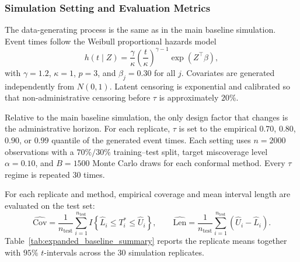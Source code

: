 \documentclass[12pt]{article}
\makeatletter
\let\thesis@subsection\subsubsection
\renewcommand{\subsection}{\thesis@subsection}
\makeatother
\begin{document}
{\subsection{Simulation Setting and Evaluation Metrics}
The data-generating process is the same as in the main baseline simulation. Event times follow the Weibull proportional hazards model
\[
h(t\mid Z)=\frac{\gamma}{\kappa}\left(\frac{t}{\kappa}\right)^{\gamma-1}\exp(Z^\top\beta),
\]
with $\gamma=1.2$, $\kappa=1$, $p=3$, and $\beta_j=0.30$ for all $j$. Covariates are generated independently from $N(0,1)$. Latent censoring is exponential and calibrated so that non-administrative censoring before $\tau$ is approximately $20\%$.

Relative to the main baseline simulation, the only design factor that changes is the administrative horizon. For each replicate, $\tau$ is set to the empirical $0.70$, $0.80$, $0.90$, or $0.99$ quantile of the generated event times. Each setting uses $n=2000$ observations with a $70\%/30\%$ training--test split, target miscoverage level $\alpha=0.10$, and $B=1500$ Monte Carlo draws for each conformal method. Every $\tau$ regime is repeated $30$ times.

For each replicate and method, empirical coverage and mean interval length are evaluated on the test set:
\[
\widehat{\mathrm{Cov}}
=
\frac{1}{n_{\mathrm{test}}}\sum_{i=1}^{n_{\mathrm{test}}}
I\!\left\{\widehat L_i\le T_i^*\le \widehat U_i\right\},
\qquad
\widehat{\mathrm{Len}}
=
\frac{1}{n_{\mathrm{test}}}\sum_{i=1}^{n_{\mathrm{test}}}
(\widehat U_i-\widehat L_i).
\]
Table~\ref{tab:expanded_baseline_summary} reports the replicate means together with $95\%$ $t$-intervals across the $30$ simulation replicates.

}
\end{document}
